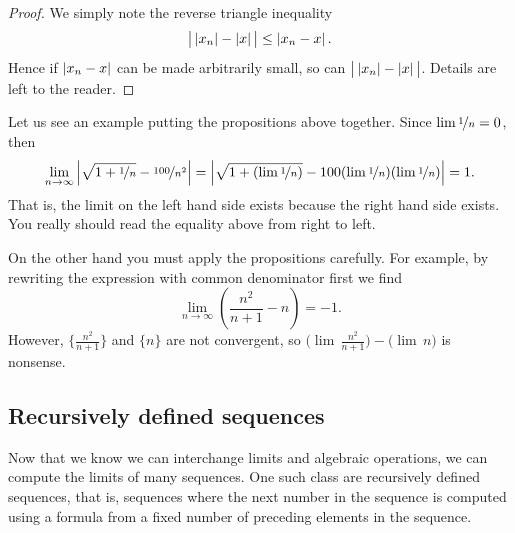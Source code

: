 \begin{proof}
We simply note the reverse triangle inequality
\begin{equation*}
\big\lvert \left\lvert {x_n} \right\rvert - \left\lvert {x} \right\rvert \big\rvert \leq \left\lvert {x_n-x} \right\rvert .
\end{equation*}
Hence if $\left\lvert {x_n -x} \right\rvert$ can be made arbitrarily small, so can
$\big\lvert \left\lvert {x_n} \right\rvert - \left\lvert {x} \right\rvert \big\rvert$.
Details are left to the reader.
\end{proof}

Let us see an example putting the propositions above together.  Since
$\lim \nicefrac{1}{n} = 0$, then
\begin{equation*}
\lim_{n\to \infty}
\left\lvert {\sqrt{1 + \nicefrac{1}{n}} - \nicefrac{100}{n^2}} \right\rvert =  
\left\lvert {\sqrt{1 + (\lim \nicefrac{1}{n})} - 100 (\lim \nicefrac{1}{n})(\lim
\nicefrac{1}{n})} \right\rvert = 1.
\end{equation*}
That is, the limit on the left hand side exists because the right hand
side exists.  You really should read the equality above from right to left.

On the other hand you must apply the propositions carefully.
For example, by rewriting the expression with common denominator first
we find
\begin{equation*}
\lim_{n\to \infty} \left( \frac{n^2}{n+1} - n \right)
= -1 .
\end{equation*}
However, 
$\bigl\{ \frac{n^2}{n+1} \bigr\}$ and 
$\{n\}$ are not convergent,
so
$\bigl(\lim\, \frac{n^2}{n+1}\bigr) -
\bigl(\lim\, n\bigr)$ is nonsense.

\subsection{Recursively defined sequences}

Now that we know we can interchange limits and algebraic operations, we can
compute the limits of many sequences.
One such class are recursively defined sequences, that is, sequences where
the next number in the sequence is computed using a formula from a fixed number
of preceding elements in the sequence.

